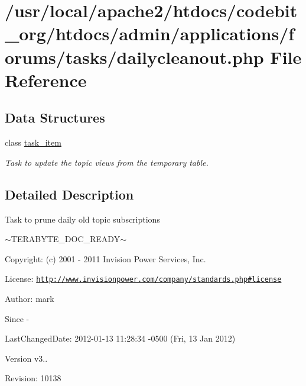 \hypertarget{dailycleanout_8php}{\section{/usr/local/apache2/htdocs/codebit\-\_\-org/htdocs/admin/applications/forums/tasks/dailycleanout.php File Reference}
\label{dailycleanout_8php}
}
\subsection*{Data Structures}
\begin{DoxyCompactItemize}
\item 
class \hyperlink{classtask__item}{task\-\_\-item}
\begin{DoxyCompactList}\small\item\em Task to update the topic views from the temporary table. \end{DoxyCompactList}\end{DoxyCompactItemize}


\subsection{Detailed Description}
\begin{DoxyVerb}  Task to prune daily old topic subscriptions
\end{DoxyVerb}
 $\sim$\-T\-E\-R\-A\-B\-Y\-T\-E\-\_\-\-D\-O\-C\-\_\-\-R\-E\-A\-D\-Y$\sim$ \begin{DoxyParagraph}{Copyright\-:}
(c) 2001 -\/ 2011 Invision Power Services, Inc.
\end{DoxyParagraph}
\begin{DoxyParagraph}{License\-:}
\href{http://www.invisionpower.com/company/standards.php#license}{\tt http\-://www.\-invisionpower.\-com/company/standards.\-php\#license}
\end{DoxyParagraph}
\begin{DoxyParagraph}{Author\-:}
mark 
\end{DoxyParagraph}
\begin{DoxySince}{Since}
-\/ 
\end{DoxySince}
\begin{DoxyParagraph}{Last\-Changed\-Date\-:}
2012-\/01-\/13 11\-:28\-:34 -\/0500 (Fri, 13 Jan 2012) 
\end{DoxyParagraph}
\begin{DoxyVersion}{Version}
v3.. 
\end{DoxyVersion}
\begin{DoxyParagraph}{Revision\-:}
10138 
\end{DoxyParagraph}
